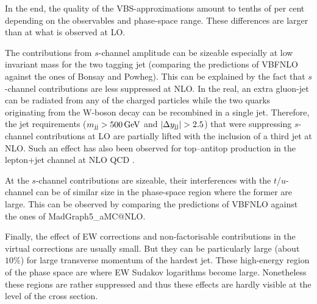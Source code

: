 In the end, the quality of the VBS-approximations amount to tenths of per cent depending on the observables and phase-space range.
These differences are larger than at what is observed at LO.

The contributions from $s$-channel amplitude can be sizeable especially at low invariant mass for the two tagging jet (comparing the predictions of {\sc VBFNLO} against the ones of {\sc Bonsay} and {\sc Powheg}).
This can be explained by the fact that $s$-channel contributions are less suppressed at NLO.
In the real, an extra gluon-jet can be radiated from any of the charged particles while the two quarks originating from the W-boson decay can be recombined in a single jet.
Therefore, the jet requirements ($ m_{\text{j} \text{j}} >  500\,\text{GeV}$ and $|\Delta y_{\text{j} \text{j}}| > 2.5$) that were suppressing $s$-channel contributions at LO are partially lifted with the inclusion of a third jet at NLO.
Such an effect has also been observed for top--antitop production in the lepton+jet channel at NLO QCD \cite{Denner:2017kzu}.

At the $s$-channel contributions are sizeable, their interferences with the $t$/$u$-channel can be of similar size in the phase-space region where the former are large.
This can be observed by comparing the predictions of {\sc VBFNLO} against the ones of {\sc MadGraph5\_aMC\-@NLO}.

Finally, the effect of EW corrections and non-factorisable contributions in the virtual corrections are usually small.
But they can be particularly large (about $10\%$) for large transverse momentum of the hardest jet.
These high-energy region of the phase space are where EW Sudakov logarithms become large.
Nonetheless these regions are rather suppressed and thus these effects are hardly visible at the level of the cross section.